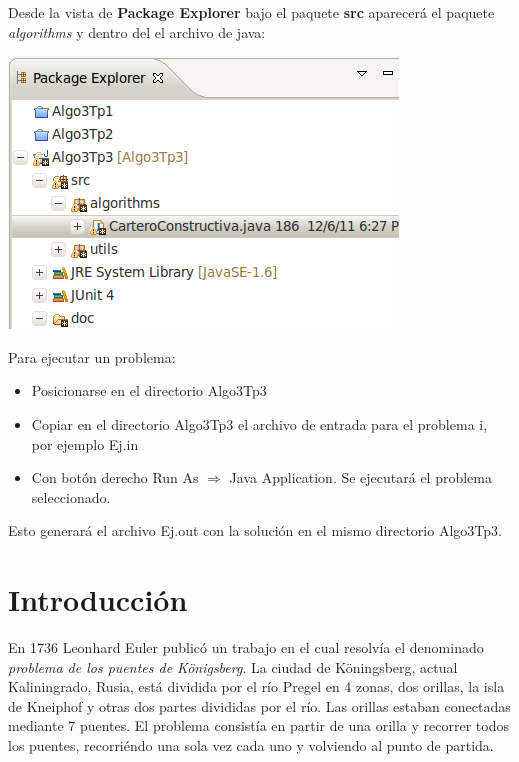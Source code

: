 \documentclass[11pt, a4paper, spanish]{article}
\begin{document}
	Desde la vista de \textbf{Package Explorer} bajo el paquete \textbf{src} aparecer\'a el paquete \emph{algorithms} y dentro del el archivo de java:\\

	\begin{center}
		\includegraphics[scale=0.65]{others/packageExplorer.png}
	\end{center}

\newpage

	Para ejecutar un problema:

	\begin{itemize}
			\item{Posicionarse en el directorio Algo3Tp3}
			\item{Copiar en el directorio Algo3Tp3 el archivo de entrada para el problema i, por ejemplo Ej.in}
			\item{Con bot\'on derecho Run As $\Rightarrow$ Java Application. Se ejecutar\'a el problema seleccionado.}
	\end{itemize}
	Esto generar\'a el archivo Ej.out con la soluci\'on en el mismo directorio Algo3Tp3.

\newpage


\section{Introducci\'on}

	En 1736 Leonhard Euler public\'o un trabajo en el cual resolv\'ia el denominado \emph{problema de los puentes de K\"{o}nigsberg}. La ciudad de K\"{o}ningsberg, actual Kaliningrado, Rusia, est\'a dividida por el r\'io Pregel en 4 zonas, dos orillas, la isla de Kneiphof y otras dos partes divididas por el r\'io. Las orillas estaban conectadas mediante 7 puentes. El problema consist\'ia en partir de una orilla y recorrer todos los puentes, recorri\'endo una sola vez cada uno y volviendo al punto de partida.\\
\end{document}
